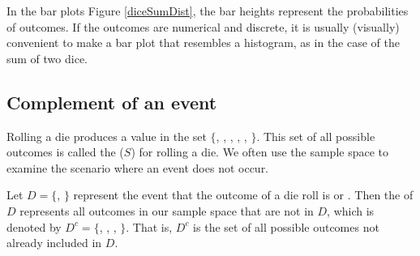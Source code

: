 In the bar plots Figure \ref{diceSumDist}, the bar heights represent the probabilities of outcomes. If the outcomes are numerical and discrete, it is usually (visually) convenient to make a bar plot that resembles a histogram, as in the case of the sum of two dice.

\subsection{Complement of an event}

Rolling a die produces a value in the set $\{$, , , , , $\}$. This set of all possible outcomes is called the  ($S$) for rolling a die. We often use the sample space to examine the scenario where an event does not occur.

Let $D=\{$, $\}$ represent the event that the outcome of a die roll is  or . Then the  of $D$ represents all outcomes in our sample space that are not in $D$, which is denoted by $D^c = \{$, , , $\}$. That is, $D^c$ is the set of all possible outcomes not already included in $D$.



